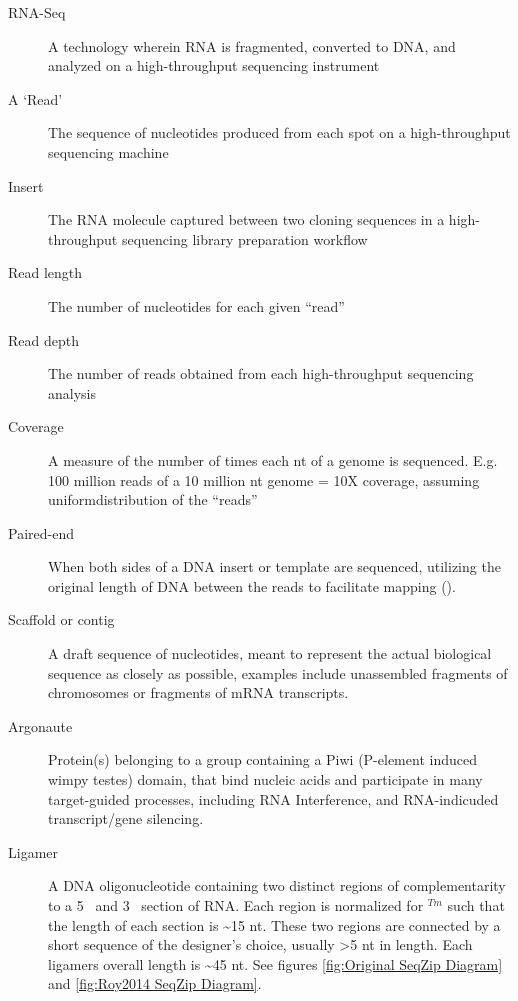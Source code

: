 \label{hd:Definitions} \listDefinitions

\begin{description}
  \item[RNA-Seq] 
  A technology wherein RNA is fragmented, converted to DNA, and analyzed on a high-throughput sequencing instrument

  \item[A ‘Read’]  
  The sequence of nucleotides produced from each spot on a high-throughput sequencing machine

  \item[Insert] 
  The RNA molecule captured between two cloning sequences in a high-throughput sequencing library preparation workflow

  \item[Read length] 
  The number of nucleotides for each given ``read''

  \item[Read depth] 
  The number of reads obtained from each high-throughput sequencing analysis

  \item[Coverage] 
  A measure of the number of times each nt of a genome is sequenced. E.g. 100 million reads of a 10 million nt genome = 10X coverage, assuming uniformdistribution of the ``reads''

  \item[Paired-end] 
  When both sides of a DNA insert or template are sequenced, utilizing the original length of DNA between the reads to facilitate mapping (\cite{Roach1995}).

  \item[Scaffold or contig] 
  A draft sequence of nucleotides, meant to represent the actual biological sequence as closely as possible, examples include unassembled fragments of chromosomes or fragments of mRNA transcripts.

  \item[Argonaute] 
  Protein(s) belonging to a group containing a Piwi (P-element induced wimpy testes) domain, that bind nucleic acids and participate in many target-guided processes, including RNA Interference, and RNA-indicuded transcript/gene silencing.

  \item[Ligamer] 
  A DNA oligonucleotide containing two distinct regions of complementarity to a 5\textprime~ and 3\textprime~ section of RNA. Each region is normalized for $^{Tm}$ such that the length of each section is \textasciitilde15 nt. These two regions are connected by a short sequence of the designer's choice, usually >5 nt in length. Each ligamers overall length is \textasciitilde45 nt. See figures \ref{fig:Original SeqZip Diagram} and \ref{fig:Roy2014 SeqZip Diagram}.
  
  \end{description}
  \clearpage %